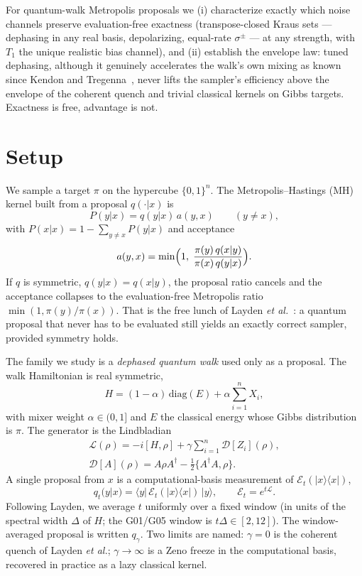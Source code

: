 \documentclass[aps,prx,reprint,floatfix,amsmath,amssymb,amsfonts]{revtex4-2}
\begin{document}
For quantum-walk Metropolis proposals we (i) characterize exactly which
noise channels preserve evaluation-free exactness (transpose-closed
Kraus sets --- dephasing in any real basis, depolarizing, equal-rate
$\sigma^\pm$ --- at any strength, with $T_1$ the unique realistic bias
channel), and (ii) establish the envelope law: tuned dephasing, although
it genuinely accelerates the walk's own mixing as known since Kendon and
Tregenna~\cite{KendonTregenna2003}, never lifts the sampler's efficiency
above the envelope of the coherent quench and trivial classical kernels
on Gibbs targets. Exactness is free, advantage is not.

\section{Setup}
\label{sec:setup}

We sample a target $\pi$ on the hypercube $\{0,1\}^n$. The
Metropolis--Hastings (MH) kernel built from a proposal $q(\cdot|x)$ is
\begin{equation}
  P(y|x)
  =
  q(y|x)\, a(y,x)
  \qquad (y \neq x),
\end{equation}
with $P(x|x) = 1 - \sum_{y \neq x} P(y|x)$ and acceptance
\begin{equation}
  a(y,x)
  =
  \min\Bigl(1,\;
  \frac{\pi(y)\, q(x|y)}{\pi(x)\, q(y|x)}\Bigr).
\end{equation}
If $q$ is symmetric, $q(y|x) = q(x|y)$, the proposal ratio cancels and
the acceptance collapses to the evaluation-free Metropolis ratio
$\min(1,\pi(y)/\pi(x))$. That is the free lunch of Layden
\emph{et al.}~\cite{Layden2023}: a quantum proposal that never has to be
evaluated still yields an exactly correct sampler, provided symmetry
holds.

The family we study is a \emph{dephased quantum walk} used only as a
proposal. The walk Hamiltonian is real symmetric,
\begin{equation}
  H
  =
  (1-\alpha)\, \mathrm{diag}(E)
  +
  \alpha \sum_{i=1}^{n} X_i,
\end{equation}
with mixer weight $\alpha \in (0,1]$ and $E$ the classical energy whose
Gibbs distribution is $\pi$. The generator is the Lindbladian
\begin{gather}
  \mathcal{L}(\rho)
  =
  -i[H,\rho]
  +
  \gamma \sum_{i=1}^{n} \mathcal{D}[Z_i](\rho),
  \nonumber\\
  \mathcal{D}[A](\rho)
  =
  A\rho A^\dagger - \tfrac12 \{A^\dagger A,\rho\}.
\end{gather}
A single proposal from $x$ is a computational-basis measurement of
$\mathcal{E}_t(|x\rangle\langle x|)$,
\begin{equation}
  q_t(y|x)
  =
  \langle y|\, \mathcal{E}_t(|x\rangle\langle x|) \,|y\rangle,
  \qquad
  \mathcal{E}_t = e^{t\mathcal{L}}.
\end{equation}
Following Layden, we average $t$ uniformly over a fixed window (in units
of the spectral width $\Delta$ of $H$; the G01/G05 window is
$t\Delta \in [2,12]$). The window-averaged proposal is written
$q_\gamma$. Two limits are named: $\gamma = 0$ is the coherent quench of
Layden \emph{et al.}; $\gamma \to \infty$ is a Zeno freeze in the
computational basis, recovered in practice as a lazy classical kernel.
\end{document}
